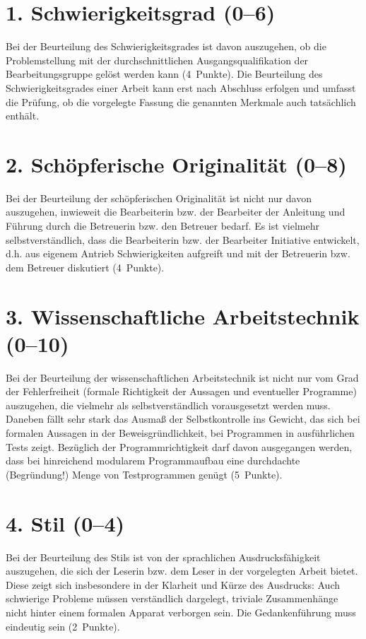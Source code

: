 \documentclass[
    fontsize=12pt,
    headings=small,
    parskip=half,           %
    bibliography=totoc,
    numbers=noenddot,       %
    open=any,               %
    ]{scrreprt}
\begin{document}
\section*{1. Schwierigkeitsgrad (0--6)}

Bei der Beurteilung des Schwierigkeitsgrades ist davon auszugehen, ob die Problemstellung mit der durchschnittlichen Ausgangsqualifikation der Bearbeitungsgruppe gelöst werden kann (4~Punkte). Die Beurteilung des Schwierigkeitsgrades einer Arbeit kann erst nach Abschluss erfolgen und umfasst die Prüfung, ob die vorgelegte Fassung die genannten Merkmale auch tatsächlich enthält.

\section*{2. Schöpferische Originalität (0--8)}

Bei der Beurteilung der schöpferischen Originalität ist nicht nur davon auszugehen, inwieweit die Bearbeiterin bzw. der Bearbeiter der Anleitung und Führung durch die Betreuerin bzw. den Betreuer bedarf. Es ist vielmehr selbstverständlich, dass die Bearbeiterin bzw. der Bearbeiter Initiative entwickelt, d.h. aus eigenem Antrieb Schwierigkeiten aufgreift und mit der Betreuerin bzw. dem Betreuer diskutiert (4~Punkte).

\section*{3. Wissenschaftliche Arbeitstechnik (0--10)}

Bei der Beurteilung der wissenschaftlichen Arbeitstechnik ist nicht nur vom Grad der Fehlerfreiheit (formale Richtigkeit der Aussagen und eventueller Programme) auszugehen, die vielmehr als selbstverständlich vorausgesetzt werden muss. Daneben fällt sehr stark das Ausmaß der Selbstkontrolle ins Gewicht, das sich bei formalen Aussagen in der Beweisgründlichkeit, bei Programmen in ausführlichen Tests zeigt. Bezüglich der Programmrichtigkeit darf davon ausgegangen werden, dass bei hinreichend modularem Programmaufbau eine durchdachte (Begründung!) Menge von Testprogrammen genügt (5~Punkte).

\section*{4. Stil (0--4)}

Bei der Beurteilung des Stils ist von der sprachlichen Ausdrucksfähigkeit auszugehen, die sich der Leserin bzw. dem Leser in der vorgelegten Arbeit bietet. Diese zeigt sich insbesondere in der Klarheit und Kürze des Ausdrucks: Auch schwierige Probleme müssen verständlich dargelegt, triviale Zusammenhänge nicht hinter einem formalen Apparat verborgen sein. Die Gedankenführung muss eindeutig sein (2~Punkte).
\end{document}
